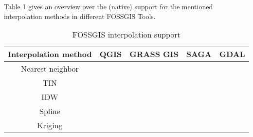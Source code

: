 Table \ref{tab:fossgis_support} gives an overview over the (native) support for the mentioned interpolation methods in different FOSSGIS Tools.

\begin{table}[H]
	\centering
	\begin{tabular}{c|c|c|c|c}
		Interpolation method & QGIS & GRASS GIS & SAGA & GDAL\\
		\hline
		Nearest neighbor & \xmark &\cmark &\cmark & \cmark \\
		\hline
		TIN & \cmark &\cmark &\cmark & \cmark \\
		\hline
		IDW & \cmark &\cmark &\cmark & \cmark \\
		\hline
		Spline & \xmark &\cmark &\cmark & \xmark \\
		\hline
		Kriging & \xmark &\cmark &\cmark & \xmark \\
	\end{tabular}
	\caption{FOSSGIS interpolation support}
	\label{tab:fossgis_support}
\end{table}







